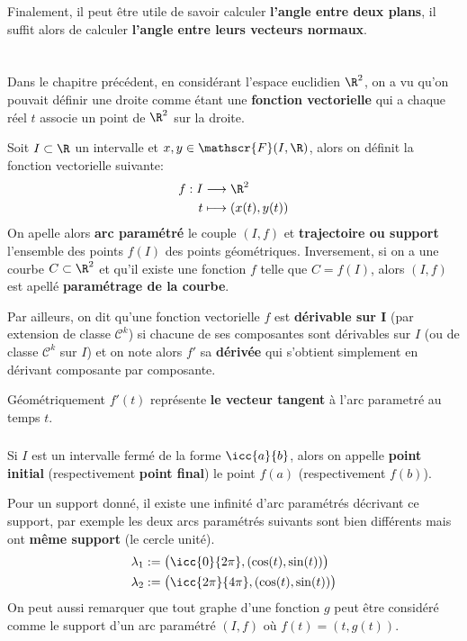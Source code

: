 Finalement, il peut être utile de savoir calculer \textbf{l'angle entre deux plans}, il suffit alors de calculer \textbf{l'angle entre leurs vecteurs normaux}.

\chapter*{}
Dans le chapitre précédent, en considérant l'espace euclidien \(\R^2\), on a vu qu'on pouvait définir une droite comme étant une \textbf{fonction vectorielle} qui a chaque réel \(t\) associe un point de \(\R^2\) sur la droite.\<

Soit \(I \subset \R\) un intervalle et \(x, y \in \mathscr{F}(I, \R)\), alors on définit la fonction vectorielle suivante:
\[
   \begin{aligned}
      f: I &\longrightarrow \R^2\\
      t &\longmapsto (x(t), y(t))
   \end{aligned}
\]
On apelle alors \textbf{arc paramétré} le couple \((I, f)\) et \textbf{trajectoire ou support} l'ensemble des points \(f(I)\) des points géométriques.\+
Inversement, si on a une courbe \(C \subset \R^2\) et qu'il existe une fonction \(f\) telle que \(C = f(I)\), alors \((I, f)\) est apellé \textbf{paramétrage de la courbe}.\<

Par ailleurs, on dit qu'une fonction vectorielle \(f\) est \textbf{dérivable sur I} (par extension de classe \(\mathcal{C}^k\)) si chacune de ses composantes sont dérivables sur \(I\) (ou de classe \(\mathcal{C}^k\) sur \(I\)) et on note alors \(f'\) sa \textbf{dérivée} qui s'obtient simplement en dérivant composante par composante.\<

Géométriquement \(f'(t)\) représente \textbf{le vecteur tangent} à l'arc parametré au temps \(t\).

\subsection*{}
Si \(I\) est un intervalle fermé de la forme \(\icc{a}{b}\), alors on appelle \textbf{point initial} (respectivement \textbf{point final}) le point \(f(a)\) (respectivement \(f(b)\)).\<

Pour un support donné, il existe une infinité d'arc paramétrés décrivant ce support, par exemple les deux arcs paramétrés suivants sont bien différents mais ont \textbf{même support} (le cercle unité).
\begin{align*}
   \lambda_1 &:= \bigl(\icc{0}{2\pi}, (\cos(t), \sin(t))\bigl) \\
   \lambda_2 &:= \bigl(\icc{2\pi}{4\pi}, (\cos(t), \sin(t))\bigl)
\end{align*}
On peut aussi remarquer que tout graphe d'une fonction \(g\) peut être considéré comme le support d'un arc paramétré \((I, f)\) où \(f(t) = (t, g(t))\). \<

